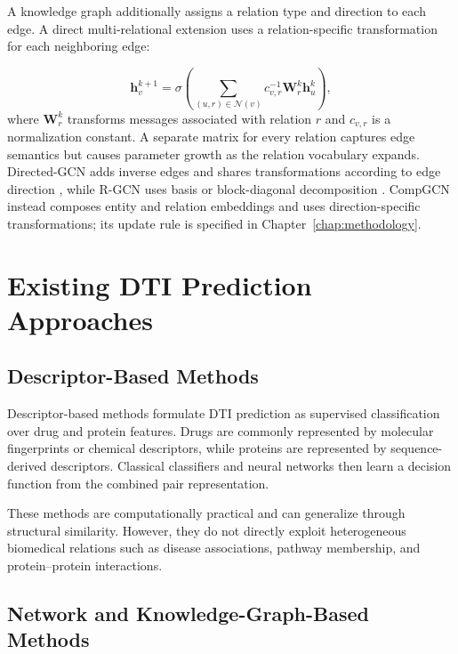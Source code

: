 A knowledge graph additionally assigns a relation type and direction to each
edge. A direct multi-relational extension uses a relation-specific
transformation for each neighboring edge:

\begin{equation}
    \mathbf{h}_{v}^{k+1}
    =
    \sigma
    \left(
        \sum_{(u,r)\in\mathcal{N}(v)}
        c_{v,r}^{-1}\mathbf{W}_{r}^{k}\mathbf{h}_{u}^{k}
    \right),
    \label{eq:background_relational_gcn_update}
\end{equation}
where $\mathbf{W}_{r}^{k}$ transforms messages associated with relation $r$
and $c_{v,r}$ is a normalization constant. A separate matrix for every
relation captures edge semantics but causes parameter growth as the relation
vocabulary expands. Directed-GCN adds inverse edges and shares transformations
according to edge direction \cite{MarcheggianiT17}, while R-GCN uses
basis or block-diagonal decomposition \cite{schlichtkrull2018modeling}.
CompGCN instead composes entity and relation embeddings and uses
direction-specific transformations; its update rule is specified in
Chapter~\ref{chap:methodology}.

\section{Existing DTI Prediction Approaches}

\subsection{Descriptor-Based Methods}

Descriptor-based methods formulate DTI prediction as supervised classification
over drug and protein features. Drugs are commonly represented by molecular
fingerprints or chemical descriptors, while proteins are represented by
sequence-derived descriptors. Classical classifiers and neural networks then
learn a decision function from the combined pair representation.

These methods are computationally practical and can generalize through
structural similarity. However, they do not directly exploit heterogeneous
biomedical relations such as disease associations, pathway membership, and
protein--protein interactions.

\subsection{Network and Knowledge-Graph-Based Methods}

